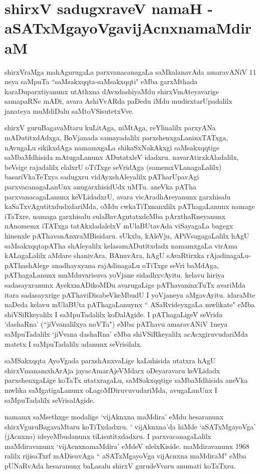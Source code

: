 \chapter*{shirxV sadugxraveV namaH - aSATxMgayoVgavijAcnxnamaMdiraM}

shirxVraMga mahAgurugaLa parxvanacanagaLa saMkalanavAda amaravANiV 11 neya saMpuTa ``saMsakxqqta-saMsakxqqti" eMba garxMthada karaDuparxtiyanunx utAthxna dAvxdashiyaMdu shirxVmAteyavarige samapaRNe mADi, avara AshiVvARda paDedu iMdu mudirxtarUpadalilx janateya muMdiDalu saMtoVSisutetxVve.

shirxV guruBagavaMtaru kuLitAga, niMtAga, reYlinalilx parxyANa mADutitxdAdxga, BoVjanada samayadalilx parxshenxgaLaninxTATxga, nAvugaLu sikikxdAga namamxgaLa shikaSxNakAkxgi saMsakxqqtige saMbaMdhisida mAtugaLanunx ADutatxleV idadxru. navarAtirxkAladalilx, beVsige rajadalilx elalxrU oTiTxge seVridAga (samemxVLanagaLalilx) basariVkaTeTxya sadugxru vidAyxshAleyalilx pATharUpavAgi parxvacanagaLanUnx anugarxhisidUdx uMTu. aneVka pATha parxvanacagaLanunx keVLidadxrU, avara vicAradhAreyanunx garxhisalu kaSaTxvAgutitxdudxdariMda, oMdu cwkaTiTxnanxlilx pAThagaLanunx namage iTaTxre, namaga garxhisalu sulaBavAgutatxdeMba pArxthaRneyanunx nAnomemx iTATxga tatAkxladalelxV mUlaBUtavAda viSayagaLa bagegx hinenxle pAThavanAnxraMBisidaru. sUkxlu, kAleVju, APiVsugagaLalilx hAgU saMsakxqqtapATha shAleyalilx kelasamADutitxdadx namamxgaLa virAma kALagaLalilx aMdare shanivAra, BAnuvAra, hAgU sAvaRtirxka rAjadinagaLu- pAThashAlege anadhayxyana rajAdinagaLu oTiTxge seVri baMdAga, pAThagaLanunx muMduvarisuva yoVjane sidadhxvAyitu.  kelavu hiriya sadasayxranunx AyekxmADikoMDu avarugaLige pAThavaninxTuTx avariMda itara sadasayxrige pAThaviDisabeVkeMbudU I yoVjaneya aMgavAyitu. idaraMte naDeda kelavu mUlaBUta pAThagaLanuynx `` ASaRvideyxgaLa mwlikate" eMba shiVSiRkeyalilx I saMpuTadalilx koDalAgide. I pAThagaLigeV seVrida `dashaRna' (``jiVvanalilxya noVTa") eMba pAThavu amaravANiV 1neya saMpuTadalilx `jiVvana dashaRna' eMba shiVSiRkeyalilx acAcxgiruvudariMda matetx I saMpuTadalilx adanunx seVrisilalx.

saMSakxqqta AyoVgada parxshAnxvaLige kaLuhisida utatxra hAgU shirxVmanamxhArAja jayacAmarAjeVMdarx oDeyaravaru keVLidadx parxshenxgaLige koTaTx utatxragaLu, saMSakxqqtige saMbaMdhisida aneVka mwlika saMgatigaLanunx oLagoMDiruvuvudariMda, avugaLanUnx I saMpuTadalilx seVrisalAgide.

namamx saMsethxge modalige `vijAknxna maMdira' eMdu hesaranunx shirxVguruBagavaMtaru koTiTxdadxru. ` vijAknxna'da hiMde `aSATxMgayoVga' (jAcnxna) ideyeMbudanunx tiLisutitxdadxru. I parxvacanagaLalilx maMdiravanunx `vijAcnxnamaMdira' eMdeV ulelxKiside. maMdiravanunx 1968 ralilx rijisaTxrf mADisuvAga `` aSATxMgayoVga vijAcnxna maMdiraM" eMba pUNaRvAda hesaranunx baLasalu shirxV gurudeVvaru anumati koTaTxru.

